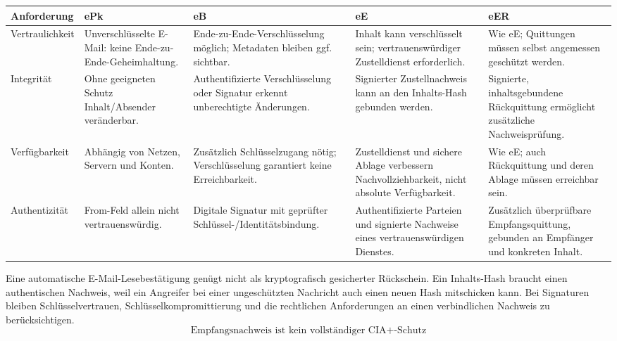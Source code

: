 \documentclass[a4paper,11pt]{article}
\newif\ifexplain
\newcommand{\explain}[1]{\ifexplain\begin{erklbox}#1\end{erklbox}\fi}
\newcommand{\ergebnis}[1]{\[\boxed{\text{#1}}\]}
\begin{document}
{\footnotesize
\begin{tabularx}{\linewidth}{>{\RaggedRight\arraybackslash}p{2.2cm}YYYY}
\toprule
Anforderung & ePk & eB & eE & eER\\ \midrule
Vertraulichkeit & Unverschlüsselte E-Mail: keine Ende-zu-Ende-Geheimhaltung. & Ende-zu-Ende-Verschlüsselung möglich; Metadaten bleiben ggf. sichtbar. & Inhalt kann verschlüsselt sein; vertrauenswürdiger Zustelldienst erforderlich. & Wie eE; Quittungen müssen selbst angemessen geschützt werden.\\
Integrität & Ohne geeigneten Schutz Inhalt/Absender veränderbar. & Authentifizierte Verschlüsselung oder Signatur erkennt unberechtigte Änderungen. & Signierter Zustellnachweis kann an den Inhalts-Hash gebunden werden. & Signierte, inhaltsgebundene Rückquittung ermöglicht zusätzliche Nachweisprüfung.\\
Verfügbarkeit & Abhängig von Netzen, Servern und Konten. & Zusätzlich Schlüsselzugang nötig; Verschlüsselung garantiert keine Erreichbarkeit. & Zustelldienst und sichere Ablage verbessern Nachvollziehbarkeit, nicht absolute Verfügbarkeit. & Wie eE; auch Rückquittung und deren Ablage müssen erreichbar sein.\\
Authentizität & From-Feld allein nicht vertrauenswürdig. & Digitale Signatur mit geprüfter Schlüssel-/Identitätsbindung. & Authentifizierte Parteien und signierte Nachweise eines vertrauenswürdigen Dienstes. & Zusätzlich überprüfbare Empfangsquittung, gebunden an Empfänger und konkreten Inhalt.\\ \bottomrule
\end{tabularx}}\par
Eine automatische E-Mail-Lesebestätigung genügt nicht als kryptografisch gesicherter Rückschein.
Ein Inhalts-Hash braucht einen authentischen Nachweis, weil ein Angreifer bei einer ungeschützten Nachricht
auch einen neuen Hash mitschicken kann. Bei Signaturen bleiben Schlüsselvertrauen, Schlüsselkompromittierung
und die rechtlichen Anforderungen an einen verbindlichen Nachweis zu berücksichtigen.
\ergebnis{Empfangsnachweis ist kein vollständiger CIA+-Schutz}
\explain{Verschlüsselung und Signatur haben verschiedene Aufgaben. Verschlüsselung schützt den
Inhalt vor Mitlesen. Eine Signatur kann Änderungen und die Herkunft prüfbar machen, wenn die
Zuordnung des Schlüssels stimmt. Keines von beiden verhindert einen Serverausfall.}
\end{document}
